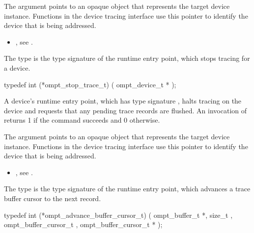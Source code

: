 \argdesc
The  argument points to an opaque object that represents
the target device instance. Functions in the device tracing interface
use this pointer to identify the device that is being addressed.

\crossreferences
\begin{itemize}
\item {}, see .
\end{itemize}



\label{sec:ompt_stop_trace_t}

\summary
The  type is the type signature of the 
 runtime entry point, which stops tracing for a device.

\begin{ccppspecific}
\begin{omptInquiry}
typedef int (*ompt_stop_trace_t) (
  ompt_device_t *
);
\end{omptInquiry}
\end{ccppspecific}

\descr
A device's  runtime entry point, which has type 
signature , halts tracing on the device and 
requests that any pending trace records are flushed. An invocation of 
 returns 1 if the command succeeds and 0 otherwise.

\argdesc
The  argument points to an opaque object that represents
the target device instance. Functions in the device tracing interface
use this pointer to identify the device that is being addressed.

\crossreferences
\begin{itemize}
\item {}, see .
\end{itemize}



\label{sec:ompt_advance_buffer_cursor_t}

\summary
The  type is the type signature of the 
 runtime entry point, which advances
a trace buffer cursor to the next record.

\format
\begin{ccppspecific}
\begin{omptInquiry}
typedef int (*ompt_advance_buffer_cursor_t) (
  ompt_buffer_t *,
  size_t ,
  ompt_buffer_cursor_t ,
  ompt_buffer_cursor_t *
);
\end{omptInquiry}
\end{ccppspecific}


